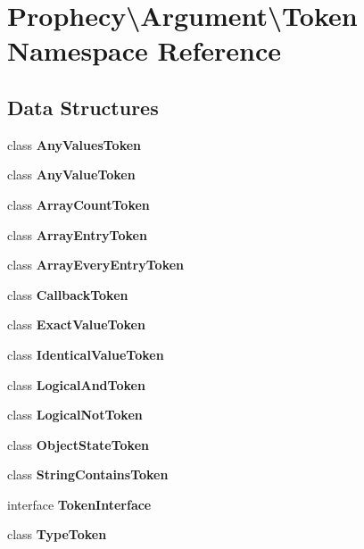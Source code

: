 \section{Prophecy\textbackslash{}Argument\textbackslash{}Token Namespace Reference}
\label{namespace_prophecy_1_1_argument_1_1_token}
\subsection*{Data Structures}
\begin{DoxyCompactItemize}
\item 
class {\bf Any\+Values\+Token}
\item 
class {\bf Any\+Value\+Token}
\item 
class {\bf Array\+Count\+Token}
\item 
class {\bf Array\+Entry\+Token}
\item 
class {\bf Array\+Every\+Entry\+Token}
\item 
class {\bf Callback\+Token}
\item 
class {\bf Exact\+Value\+Token}
\item 
class {\bf Identical\+Value\+Token}
\item 
class {\bf Logical\+And\+Token}
\item 
class {\bf Logical\+Not\+Token}
\item 
class {\bf Object\+State\+Token}
\item 
class {\bf String\+Contains\+Token}
\item 
interface {\bf Token\+Interface}
\item 
class {\bf Type\+Token}
\end{DoxyCompactItemize}
